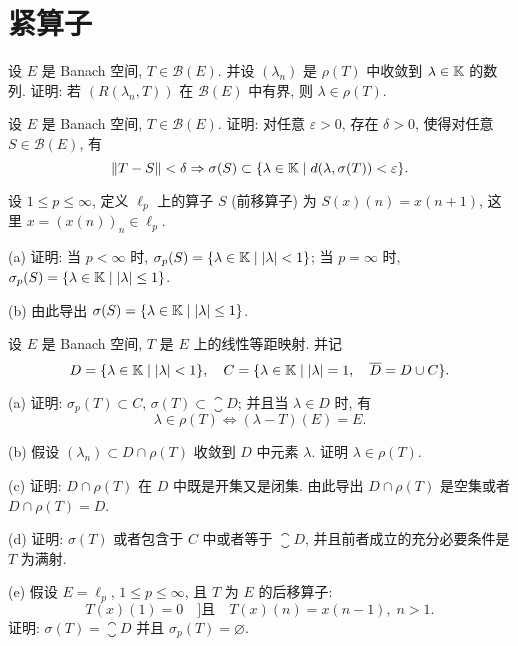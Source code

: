 \setcounter{chapter}{10}
\chapter{紧算子}




\begin{exercise}
    设 $E$ 是 Banach 空间, $T\in\mathcal{B}(E)$.
    并设 $(\lambda_n)$ 是 $\rho(T)$ 中收敛到 $\lambda\in\mathbb{K}$ 的数列.
    证明: 若 $(R(\lambda_n,T))$ 在 $\mathcal{B}(E)$ 中有界, 则 $\lambda\in\rho(T)$.
\end{exercise}



\begin{exercise}
    设 $E$ 是 Banach 空间, $T\in\mathcal{B}(E)$.
    证明: 对任意 $\varepsilon>0$, 存在 $\delta>0$, 使得对任意 $S\in\mathcal{B}(E)$, 有
    \[\|T-S\|<\delta\Rightarrow\sigma(S)\subset\{\lambda\in\mathbb{K}\mid d(\lambda,\sigma(T))<\varepsilon\}.\]
\end{exercise}



\begin{exercise}
    设 $1\leq p\leq\infty$, 定义 $\ell_p$ 上的算子 $S$ (前移算子) 为 $S(x)(n)=x(n+1)$,
    这里 $x=(x(n))_n\in\ell_p$.

    (a) 证明: 当 $p<\infty$ 时, $\sigma_p(S)=\{\lambda\in\mathbb{K}\mid |\lambda|<1\}$;
    当 $p=\infty$ 时, $\sigma_p(S)=\{\lambda\in\mathbb{K}\mid |\lambda|\leq 1\}$.

    (b) 由此导出 $\sigma(S)=\{\lambda\in\mathbb{K}\mid |\lambda|\leq 1\}$.
\end{exercise}



\begin{exercise}
    设 $E$ 是 Banach 空间, $T$ 是 $E$ 上的线性等距映射. 并记
    \[D=\{\lambda\in\mathbb{K}\mid |\lambda|<1\},\quad C=\{\lambda\in\mathbb{K}\mid |\lambda|=1,\quad\overline{D}=D\cup C\}.\]

    (a) 证明: $\sigma_p(T)\subset C$, $\sigma(T)\subset\closure{D}$; 并且当 $\lambda\in D$ 时, 有
    \[\lambda\in\rho(T)\Leftrightarrow (\lambda-T)(E)=E.\]

    (b) 假设 $(\lambda_n)\subset D\cap\rho(T)$ 收敛到 $D$ 中元素 $\lambda$. 证明 $\lambda\in\rho(T)$.

    (c) 证明: $D\cap\rho(T)$ 在 $D$ 中既是开集又是闭集. 由此导出 $D\cap\rho(T)$ 是空集或者 $D\cap\rho(T)=D$.

    (d) 证明: $\sigma(T)$ 或者包含于 $C$ 中或者等于 $\closure{D}$, 并且前者成立的充分必要条件是 $T$ 为满射.

    (e) 假设 $E=\ell_p$, $1\leq p\leq\infty$, 且 $T$ 为 $E$ 的后移算子:
    \[T(x)(1)=0\quad]\text{且}\quad T(x)(n)=x(n-1),\; n>1.\]
    证明: $\sigma(T)=\closure{D}$ 并且 $\sigma_p(T)=\varnothing$.
\end{exercise}



